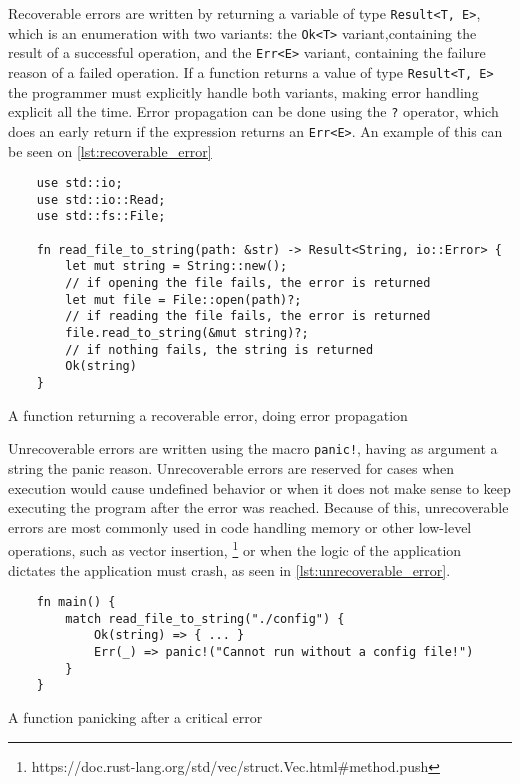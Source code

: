 Recoverable errors are written by returning a variable of type \texttt{Result<T, E>}, which is an enumeration with two variants: the \texttt{Ok<T>} variant,containing the result of a successful operation, and the \texttt{Err<E>} variant, containing the failure reason of a failed operation. If a function returns a value of type \texttt{Result<T, E>} the programmer must explicitly handle both variants, making error handling explicit all the time. Error propagation can be done using the \texttt{?} operator, which does an early return if the expression returns an \texttt{Err<E>}. An example of this can be seen on \ref{lst:recoverable_error}

\begin{listing}[h]
	\begin{verbatim}
    use std::io;
    use std::io::Read;
    use std::fs::File;

    fn read_file_to_string(path: &str) -> Result<String, io::Error> {
        let mut string = String::new();
        // if opening the file fails, the error is returned
        let mut file = File::open(path)?;
        // if reading the file fails, the error is returned
        file.read_to_string(&mut string)?;
        // if nothing fails, the string is returned
        Ok(string)
    }
    \end{verbatim}
  \caption{A function returning a recoverable error, doing error propagation}
  \label{lst:recoverable_error}
\end{listing}

Unrecoverable errors are written using the macro \texttt{panic!}, having as argument a string the panic reason. Unrecoverable errors are reserved for cases when execution would cause undefined behavior or when it does not make sense to keep executing the program after the error was reached. Because of this, unrecoverable errors are most commonly used in code handling memory or other low-level operations, such as vector insertion, \footnote{https://doc.rust-lang.org/std/vec/struct.Vec.html\#method.push} or when the logic of the application dictates the application must crash, as seen in \ref{lst:unrecoverable_error}.

\begin{listing}[h]
	\begin{verbatim}
    fn main() {
        match read_file_to_string("./config") {
            Ok(string) => { ... }
            Err(_) => panic!("Cannot run without a config file!")
        }
    }
    \end{verbatim}
  \caption{A function panicking after a critical error}
  \label{lst:unrecoverable_error}
\end{listing}

